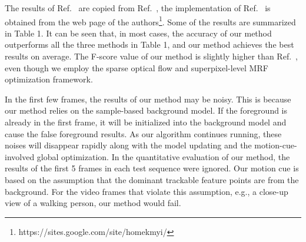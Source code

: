 The results of Ref.~ are copied from Ref.~, the implementation of Ref.~ is obtained from the web page of the authors\footnote{https://sites.google.com/site/homekmyi/}. Some of the results are summarized in Table 1. It can be seen that, in most cases, the accuracy of our method outperforms all the three methods in Table 1, and our method achieves the best results on average. The F-score value of our method is slightly higher than Ref.~, even though we employ the sparse optical flow and superpixel-level MRF optimization framework.\par
In the first few frames, the results of our method may be noisy. This is because our method relies on the sample-based background model. If the foreground is already in the first frame, it will be initialized into the background model and cause the false foreground results. As our algorithm continues running, these noises will disappear rapidly along with the model updating and the motion-cue-involved global optimization. In the quantitative evaluation of our method, the results of the first 5 frames in each test sequence were ignored. Our motion cue is based on the assumption that the dominant trackable feature points are from the background. For the video frames that violate this assumption, e.g., a close-up view of a walking person, our method would fail.\par


